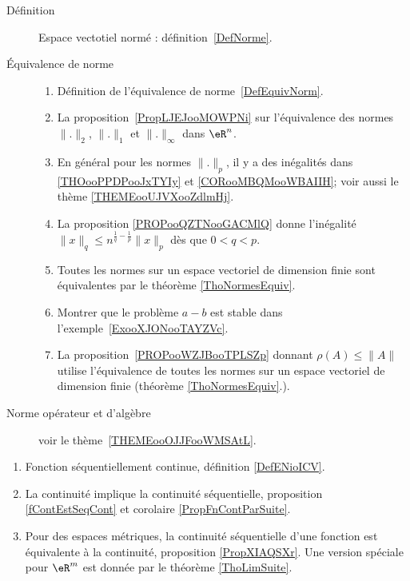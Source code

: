 \begin{description}
    \item[Définition] Espace vectotiel normé : définition~\ref{DefNorme}.
    \item[Équivalence de norme]

        \begin{enumerate}
        \item
            Définition de l'équivalence de norme~\ref{DefEquivNorm}.
\item
    La proposition~\ref{PropLJEJooMOWPNi} sur l'équivalence des normes \( \| . \|_2\), \( \| . \|_1\) et \( \| . \|_{\infty}\)  dans \( \eR^n\).
\item
     En général pour les normes \( \| . \|_p\), il y a des inégalités dans \ref{THOooPPDPooJxTYIy} et \ref{CORooMBQMooWBAIIH}; voir aussi le thème \ref{THEMEooUJVXooZdlmHj}.
 \item
     La proposition \ref{PROPooQZTNooGACMlQ} donne l'inégalité \( \| x \|_q\leq n^{\frac{1}{ q }-\frac{1}{ p }}\| x \|_p\) dès que \( 0<q<p\).
\item
    Toutes les normes sur un espace vectoriel de dimension finie sont équivalentes par le théorème \ref{ThoNormesEquiv}.
\item
    Montrer que le problème \( a-b\) est stable dans l'exemple~\ref{ExooXJONooTAYZVc}.
\item
    La proposition~\ref{PROPooWZJBooTPLSZp} donnant \( \rho(A)\leq \| A \|\) utilise l'équivalence de toutes les normes sur un espace vectoriel de dimension finie (théorème \ref{ThoNormesEquiv}.).

        \end{enumerate}

    \item[Norme opérateur et d'algèbre] voir le thème~\ref{THEMEooOJJFooWMSAtL}.

\end{description}

    \begin{enumerate}
        \item
            Fonction séquentiellement continue, définition \ref{DefENioICV}.
        \item
            La continuité implique la continuité séquentielle, proposition \ref{fContEstSeqCont} et corolaire \ref{PropFnContParSuite}.
        \item
            Pour des espaces métriques, la continuité séquentielle d'une fonction est équivalente à la continuité, proposition \ref{PropXIAQSXr}. Une version spéciale pour \( \eR^m\) est donnée par le théorème \ref{ThoLimSuite}.
    \end{enumerate}


